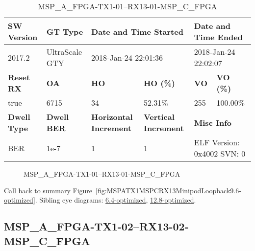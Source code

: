 \begin{table}[h]
\centering
\caption{MSP\_A\_FPGA-TX1-01--RX13-01-MSP\_C\_FPGA}
\label{tab:MSPAFPGATX101RX1301MSPCFPGA9.6-optimized}
\begin{tabular}{@{}|l|l|l|l|l|l|@{}}
\toprule
\textbf{SW Version}                & \textbf{GT Type}   & \multicolumn{2}{l|}{\textbf{Date and Time Started}}            & \multicolumn{2}{l|}{\textbf{Date and Time Ended}}        \\ \midrule
2017.2                       & UltraScale GTY          & \multicolumn{2}{l|}{2018-Jan-24 22:01:36}                   & \multicolumn{2}{l|}{2018-Jan-24 22:02:07}               \\ \midrule
\textbf{Reset RX}                  & \textbf{OA} & \textbf{HO}   & \textbf{HO (\%)} & \textbf{VO} & \textbf{VO (\%)} \\ \midrule
true & 6715        & 34          & 52.31\%        & 255        & 100.00\%       \\ \midrule
\textbf{Dwell Type}                & \textbf{Dwell BER} & \textbf{Horizontal Increment} & \textbf{Vertical Increment}    & \multicolumn{2}{l|}{\textbf{Misc Info}}                  \\ \midrule
BER                            & 1e-7        & 1        & 1           & \multicolumn{2}{l|}{ELF Version: 0x4002 SVN: 0}                         \\ \bottomrule
\end{tabular}
\end{table}

\begin{figure}[h]
\caption{MSP\_A\_FPGA-TX1-01--RX13-01-MSP\_C\_FPGA} \label{fig:MSPAFPGATX101RX1301MSPCFPGA9.6-optimized}
\end{figure}

Call back to summary Figure~\ref{fig:MSPATX1MSPCRX13MinipodLoopback9.6-optimized}.
Sibling eye diagrams: \hyperref[sec:MSPAFPGATX101RX1301MSPCFPGA6.4-optimized]{6.4-optimized}, \hyperref[sec:MSPAFPGATX101RX1301MSPCFPGA12.8-optimized]{12.8-optimized}.

\clearpage
\newpage


\subsection{MSP\_A\_FPGA-TX1-02--RX13-02-MSP\_C\_FPGA}\label{sec:MSPAFPGATX102RX1302MSPCFPGA9.6-optimized}


